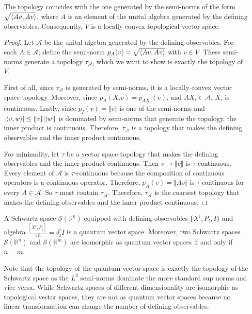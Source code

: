 \documentclass{techbrief}
\begin{document}
\begin{coro}
	The topology coincides with the one generated by the semi-norms of the form $\sqrt{\langle Av, Av\rangle}$, where $A$ is an element of the unital algebra generated by the defining observables. Consequently, $V$ is a locally convex topological vector space.
\end{coro}

\begin{proof}
	Let $\mathcal{A}$ be the unital algebra generated by the defining observables. For each $A \in \mathcal{A}$, define the semi-norm $p_A(v) = \sqrt{\langle Av, Av\rangle}$ with $v \in V$. These semi-norms generate a topology $\tau_{\mathcal{A}}$, which we want to show is exactly the topology of $V$.
	
	First of all, since $\tau_{\mathcal{A}}$ is generated by semi-norms, it is a locally convex vector space topology. Moreover, since $p_A(X_i v) = p_{A X_i}(v)$, and $A X_i \in \mathcal{A}$, $X_i$ is continuous. Lastly, since $p_I(v) = \Vert v \Vert$ is one of the semi-norms and $|\langle v, w \rangle| \leq \Vert v \Vert \Vert w \Vert$ is dominated by semi-norms that generate the topology, the inner product is continuous. Therefore, $\tau_{\mathcal{A}}$ is a topology that makes the defining observables and the inner product continuous.
	
	For minimality, let $\tau$ be a vector space topology that makes the defining observables and the inner product continuous. Then $v \to \Vert v \Vert$ is $\tau$-continuous. Every element of $\mathcal{A}$ is $\tau$-continuous because the composition of continuous operators is a continuous operator. Therefore, $p_A(v) = \Vert A v \Vert$ is $\tau$-continuous for every $A \in \mathcal{A}$. So $\tau$ must contain $\tau_{\mathcal{A}}$. Therefore, $\tau_{\mathcal{A}}$ is the coarsest topology that makes the defining observables and the inner product continuous.
\end{proof}

\begin{example}[Schwartz]
	A Schwartz space $\mathcal{S}(\mathbb{R}^n)$ equipped with defining observables $\{X^i, P_i, I\}$ and algebra $\frac{[X^i, P_j]}{\imath \hbar} = \delta^i_j I$ is a quantum vector space. Moreover, two Schwartz spaces $\mathcal{S}(\mathbb{R}^n)$ and $\mathcal{S}(\mathbb{R}^m)$ are isomorphic as quantum vector spaces if and only if $n=m$.
\end{example}

\begin{remark}
	Note that the topology of the quantum vector space is exactly the topology of the Schwartz space as the $L^2$ semi-norms dominate the more standard sup norms and vice-versa. While Schwartz spaces of different dimensionality are isomorphic as topological vector spaces, they are not as quantum vector spaces because no linear transformation can change the number of defining observables.
\end{remark}
\end{document}
